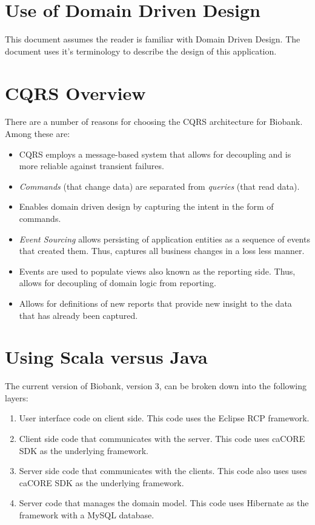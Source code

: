 \section{Use of Domain Driven Design}

This document assumes the reader is familiar with Domain Driven Design. The
document uses it's terminology to describe the design of this application.

\section{CQRS Overview}

There are a number of reasons for choosing the CQRS architecture for
Biobank. Among these are:

\begin{itemize}
\item CQRS employs a message-based system that allows for decoupling and is more
  reliable against transient failures.
\item \emph{Commands} (that change data) are separated from \emph{queries}
  (that read data).
\item Enables domain driven design by capturing the intent in the form of
  commands.
\item \emph{Event Sourcing} allows persisting of application entities as a
  sequence of events that created them. Thus, captures all business changes in a
  loss less manner.
\item Events are used to populate views also known as the reporting side. Thus,
  allows for decoupling of domain logic from reporting.
\item Allows for definitions of new reports that provide new insight to the
  data that has already been captured.
\end{itemize}

\section{Using Scala versus Java}

The current version of Biobank, version 3, can be broken down into the
following layers:

\begin{enumerate}
\item User interface code on client side. This code uses the Eclipse RCP
  framework.
\item Client side code that communicates with the server. This code uses caCORE
  SDK as the underlying framework.
\item Server side code that communicates with the clients. This code also uses
  uses caCORE SDK as the underlying framework.
\item Server code that manages the domain model. This code uses Hibernate as
  the framework with a MySQL database.
\end{enumerate}

